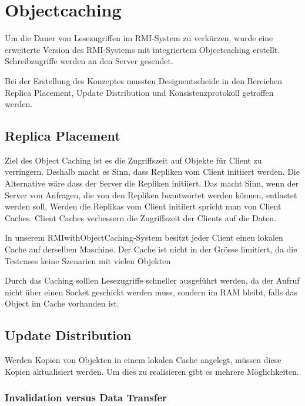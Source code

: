 \chapter{Objectcaching}
\label{sec:object-caching}

Um die Dauer von Lesezugriffen im RMI-System zu verkürzen, wurde eine erweiterte Version des RMI-Systems mit integriertem Objectcaching erstellt. Schreibzugriffe werden an den Server gesendet. 

Bei der Erstellung des Konzeptes mussten Designentscheide in den Bereichen Replica Placement, Update Distribution und Konsistenzprotokoll getroffen werden.

\section{Replica Placement}
\label{sec:replica-management}

Ziel des Object Caching ist es die Zugriffszeit auf Objekte für Client zu verringern. Deshalb macht es Sinn, dass Repliken vom Client initiiert werden. Die Alternative wäre dass der Server die Repliken initiiert. Das macht Sinn, wenn der Server von Anfragen, die von den Repliken beantwortet werden können, entlastet werden soll,  Werden die Replikas vom Client initiiert spricht man von Client Caches. Client Caches verbessern die Zugriffszeit der Clients auf die Daten.

In unserem RMIwithObjectCaching-System besitzt jeder Client einen lokalen Cache auf derselben Maschine. Der Cache ist nicht in der Grösse limitiert, da die Testcases keine Szenarien mit vielen Objekten 

Durch das Caching solllen Lesezugriffe schneller ausgeführt werden, da der Aufruf nicht über einen Socket geschickt werden muss, sondern im RAM bleibt, falls das Object im Cache vorhanden ist.

\section{Update Distribution}
\label{sec:update-distribution}

Werden Kopien von Objekten in einem lokalen Cache angelegt, müssen diese Kopien aktualisiert werden. Um dies zu realisieren gibt es mehrere Möglich\-keiten.

\subsection{Invalidation versus Data Transfer}
\label{sec:inval-vers-data}

